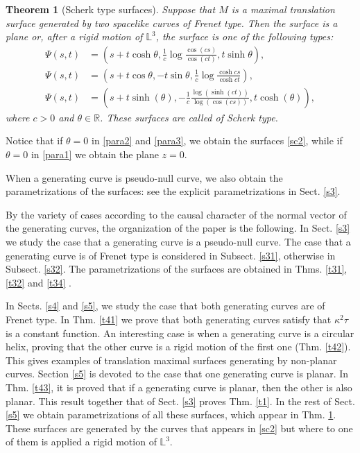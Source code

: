\documentclass[a4paper,12pt]{amsart}
\numberwithin{equation}{section}
\newtheorem{theorem}{Theorem}[section]
\theoremstyle{definition}
\def\r{\mathbb R}
\def\r{\mathbb R}
\def\rr{\mathbb L}
\begin{document}
\begin{theorem}[Scherk type surfaces]\label{t2}  Suppose that  $M$ is a maximal translation surface generated by two spacelike curves of Frenet type. Then the surface is a plane or, after a rigid motion of $\rr^3$, the surface is one of the following types:
\begin{align}
\Psi(s,t)&=\left(s+t\cosh\theta, \frac{1}{c}\log\frac{\cos(cs)}{\cos(ct)},t\sinh\theta\right),\label{para1}\\
  \Psi(s,t)&=\left(s+t\cos\theta,-t\sin\theta,\frac{1}{c} \log\frac{\cosh cs}{\cosh ct}\right),\label{para2}\\
  \Psi(s,t)&=\left(s+t \sinh (\theta ),-\frac{1}{c}\frac{\log (\sinh (c t))}{\log (\cos (c s))},t \cosh (\theta )\right),\label{para3}
  \end{align}
 where $c>0$ and $\theta\in\r$. These surfaces are called of  Scherk type.  
  \end{theorem}
Notice that if $\theta=0$ in \eqref{para2} and \eqref{para3}, we obtain the surfaces \eqref{sc2}, while if $\theta=0$ in \eqref{para1} we obtain  the plane $z=0$.

When a generating curve is pseudo-null curve, we also obtain the parametrizations of the surfaces: see the explicit parametrizations in Sect. \ref{s3}.



By the variety of cases according to the causal character of the normal vector of the generating curves,  the organization of the paper is the following. In Sect. \ref{s3} we study the case that a generating curve is a pseudo-null curve. The case that  a generating curve is of Frenet type is considered in Subsect. \ref{s31}, otherwise    in Subsect. \ref{s32}. The parametrizations of the surfaces are obtained in Thms. \ref{t31}, \ref{t32} and \ref{t34} .
 

In Sects. \ref{s4} and \ref{s5}, we study the case that both generating curves are of Frenet type.  In Thm. \ref{t41} we prove that both  generating curves satisfy that   $\kappa^2\tau$ is a constant function. An interesting case is when a generating curve is a circular helix, proving that  the other curve is a rigid motion of the first one (Thm. \ref{t42}).  This gives examples of translation maximal surfaces generating by non-planar curves. Section \ref{s5} is devoted to the case that one generating curve is planar. In Thm. \ref{t43}, it is proved that if a generating curve is planar, then the other is also planar.  This result together that of Sect. \ref{s3} proves Thm. \ref{t1}. In the rest of Sect. \ref{s5} we obtain parametrizations of all these  surfaces, which appear in Thm. \ref{t2}. These surfaces are generated by the curves that appears in \eqref{sc2} but where to one of them is applied  a rigid motion of $\rr^3$.   
\end{document}
